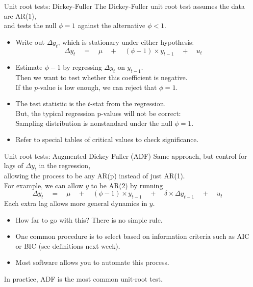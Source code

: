 \documentclass[t,12pt]{beamer}
\begin{document}
\begin{frame}[c]{Unit root tests: Dickey-Fuller}
The Dickey-Fuller unit root test assumes the data are AR(1), 
\\ and tests the null $\phi=1$ against the alternative $\phi < 1$.
\begin{itemize}
\item Write out $\Delta y_t$, which is stationary under either hypothesis:
$$
\Delta y_t \quad = \quad \mu \quad + \quad (\phi - 1) \times y_{t-1} \quad + \quad u_t
$$
\vspace{-0.2in}
\item Estimate $\phi-1$ by regressing $\Delta y_t$ on $y_{t-1}$.
\\ Then we want to test whether this coefficient is negative.
\\ If the $p$-value is low enough, we can reject that $\phi=1$.
\item The test statistic is the $t$-stat from the regression.
\\ But, the typical regression p-values will not be correct:
\\ Sampling distribution is nonstandard under the null $\phi=1$.
\item Refer to special tables of critical values to check significance.
\end{itemize}
\end{frame}

\begin{frame}[c]{Unit root tests: Augmented Dickey-Fuller (ADF)}
Same approach, but control for lags of $\Delta y_t$ in the regression,
\\ allowing the process to be any AR(p) instead of just AR(1).
\\ \medskip
For example, we can allow $y$ to be AR(2) by running
$$
\Delta y_t \quad = \quad \mu \quad + \quad (\phi - 1) \times y_{t-1} \quad + \quad \delta \times \Delta y_{t-1} \quad + \quad u_t
$$
Each extra lag allows more general dynamics in $y$.
\begin{itemize}
\item How far to go with this? There is no simple rule. 
\item One common procedure is to select based on information criteria such as AIC or BIC (see definitions next week).
\item Most software allows you to automate this process.
\end{itemize}
\medskip
In practice, ADF is the most common unit-root test.
\end{frame}
\end{document}
